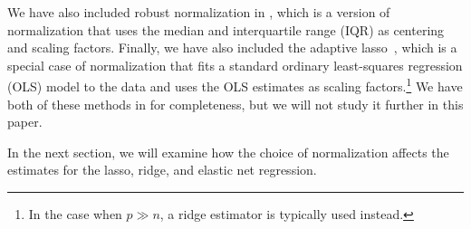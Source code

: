 We have also included robust normalization in , which is a
version of normalization that uses the median and interquartile range (IQR) as centering
and scaling factors. Finally, we have also included the adaptive lasso~\citep{zou2006a},
which is a special case of normalization that fits a standard ordinary least-squares
regression (OLS) model to the data and uses the OLS estimates as scaling
factors.\footnote{In the case when \(p \gg n\), a ridge estimator is typically used
  instead.} We have both of these methods in  for completeness,
but we will not study it further in this paper.

In the next section, we will examine how the choice of normalization affects the estimates
for the lasso, ridge, and elastic net regression.

